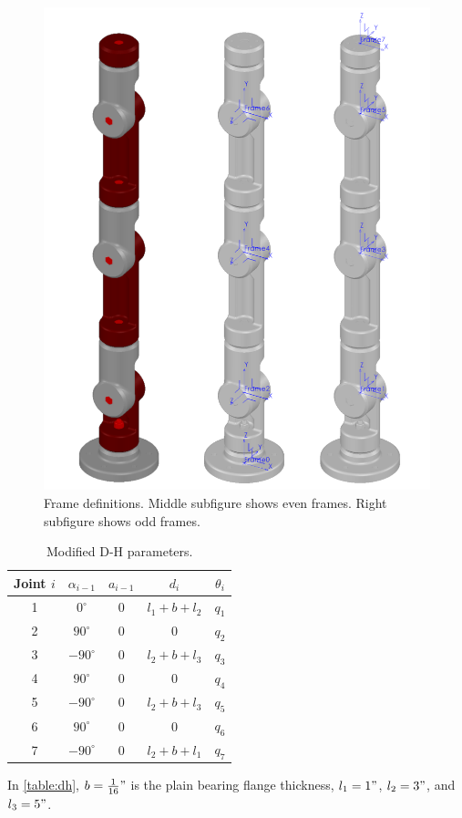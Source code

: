 \documentclass{article}
\begin{document}
\begin{figure}[h]
  \centering
  \includegraphics[height=0.5\linewidth]{media/frames}
  \caption{Frame definitions. Middle subfigure shows even frames. Right subfigure shows odd frames.}
  \label{fig:frames}
\end{figure}

\begin{table}[h]
\begin{center}
\caption{Modified D-H parameters.}
\label{table:dh}
\begin{tabular}{|c c c c c|}
  \hline
  Joint $i$ & $\alpha_{i-1}$ & $a_{i-1}$ & $d_i$ & $\theta_i$ \\
  \hline
  1 & $0^\circ$ & 0 & $l_1 + b + l_2$ & $q_1$ \\
  2 & $90^\circ$ & 0 & 0 & $q_2$ \\
  3 & $-90^\circ$ & 0 & $l_2 + b + l_3$ & $q_3$ \\
  4 & $90^\circ$ & 0 & 0 & $q_4$ \\
  5 & $-90^\circ$ & 0 & $l_2 + b + l_3$ & $q_5$ \\
  6 & $90^\circ$ & 0 & 0 & $q_6$ \\
  7 & $-90^\circ$ & 0 & $l_2 + b + l_1$ & $q_7$ \\
  \hline
\end{tabular}
\end{center}
\end{table}
In \autoref{table:dh}, $b = \frac{1}{16}"$ is the plain bearing flange thickness,
$l_1 = 1"$, $l_2 = 3"$, and $l_3 = 5"$.
\end{document}
